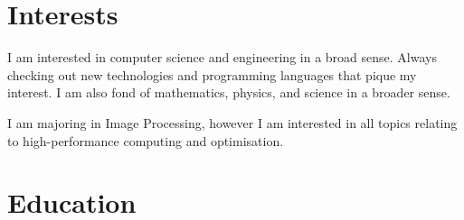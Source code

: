 \documentclass[letterpaper]{twentysecondcv} %
\begin{document}





\makeprofile %


\section{Interests}

I am interested in computer science and engineering in a broad sense. Always
checking out new technologies and programming languages that pique my interest.
I am also fond of mathematics, physics, and science in a broader sense.

I am majoring in Image Processing, however I am interested in all topics
relating to high-performance computing and optimisation.


\section{Education}
\end{document}
